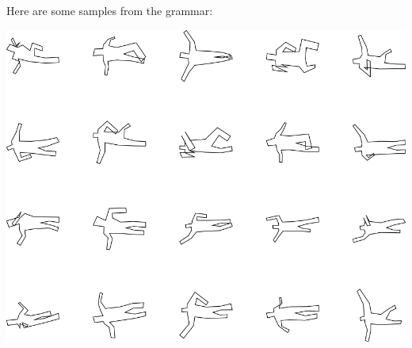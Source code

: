 Here are some samples from the grammar:

\includegraphics[width=6in]{output/3.learning/sdf_tuning/gram.7.d/samples.png}

